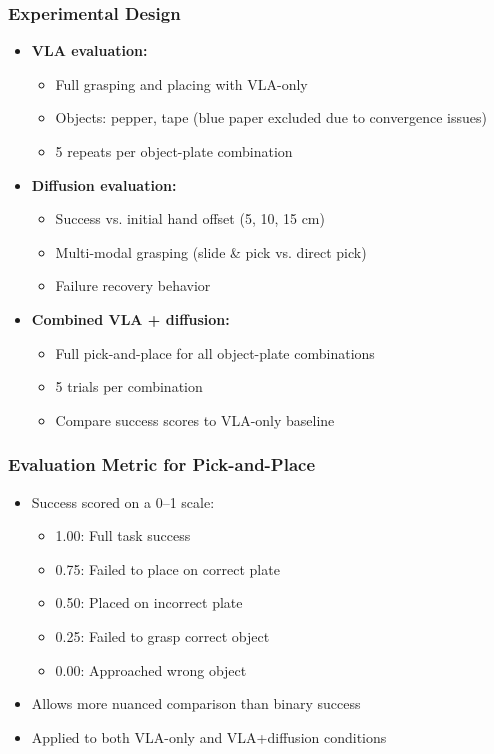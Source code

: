 \documentclass{beamer}
\begin{document}
\begin{frame}
  \frametitle{Experimental Design}
  \small
  \begin{itemize}
    \item \textbf{VLA evaluation:}
      \begin{itemize}
        \item Full grasping and placing with VLA-only
        \item Objects: pepper, tape (blue paper excluded due to convergence issues)
        \item 5 repeats per object-plate combination
      \end{itemize}
    \item \textbf{Diffusion evaluation:}
      \begin{itemize}
        \item Success vs. initial hand offset (5, 10, 15 cm)
        \item Multi-modal grasping (slide \& pick vs. direct pick)
        \item Failure recovery behavior
      \end{itemize}
    \item \textbf{Combined VLA + diffusion:}
      \begin{itemize}
        \item Full pick-and-place for all object-plate combinations
        \item 5 trials per combination
        \item Compare success scores to VLA-only baseline
      \end{itemize}
  \end{itemize}
\end{frame}

\begin{frame}
  \frametitle{Evaluation Metric for Pick-and-Place}
  \small
  \begin{itemize}
    \item Success scored on a 0--1 scale:
      \begin{itemize}
        \item 1.00: Full task success
        \item 0.75: Failed to place on correct plate
        \item 0.50: Placed on incorrect plate
        \item 0.25: Failed to grasp correct object
        \item 0.00: Approached wrong object
      \end{itemize}
    \item Allows more nuanced comparison than binary success
    \item Applied to both VLA-only and VLA+diffusion conditions
  \end{itemize}
\end{frame}
\end{document}
